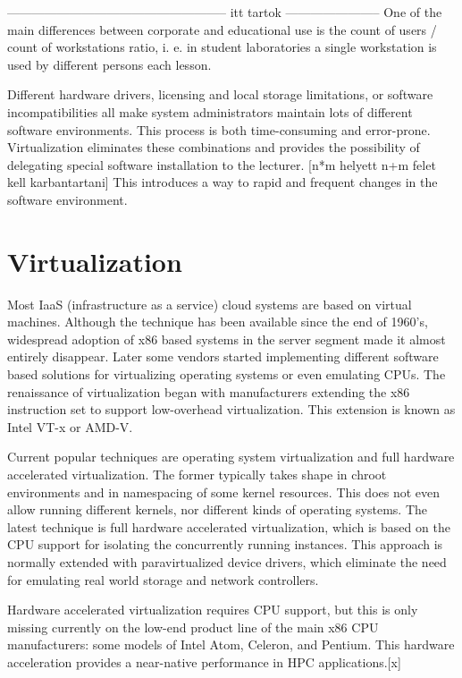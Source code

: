 \documentclass{llncs}
\begin{document}
 ----------------------------------------------------- itt tartok  -----------------------
One of the main differences between corporate and educational use is the count of users / count of workstations ratio, i. e. in student laboratories a single workstation is used by different persons each lesson.

Different hardware drivers, licensing and local storage limitations, or software incompatibilities all make system administrators maintain lots of different software environments. This process is both time-consuming and error-prone. Virtualization eliminates these combinations and provides the possibility of delegating special software installation to the lecturer. [n*m helyett n+m felet kell karbantartani] This introduces a way to rapid and frequent changes in the software environment.

\section{Virtualization}
Most IaaS (infrastructure as a service) cloud systems are based on virtual machines. Although the technique has been available since the end of 1960's, widespread adoption of x86 based systems in the server segment made it almost entirely disappear. Later some vendors started implementing different software based solutions for virtualizing operating systems or even emulating CPUs. The renaissance of virtualization began with manufacturers extending the x86 instruction set to  support low-overhead virtualization. This extension is known as Intel VT-x or AMD-V.

Current popular techniques are operating system virtualization and full hardware accelerated virtualization. The former typically takes shape in chroot environments and in namespacing of some kernel resources. This does not even allow running different kernels, nor different kinds of operating systems. The latest technique is full hardware accelerated virtualization, which is based on the CPU support for isolating the concurrently running instances. This approach is normally extended with paravirtualized device drivers, which eliminate the need for emulating real world storage and network controllers.

Hardware accelerated virtualization requires CPU support, but this is only missing currently on the low-end product line of the main x86 CPU manufacturers: some models of Intel Atom, Celeron, and Pentium. This hardware acceleration provides a near-native performance in HPC applications.[x]
\end{document}
